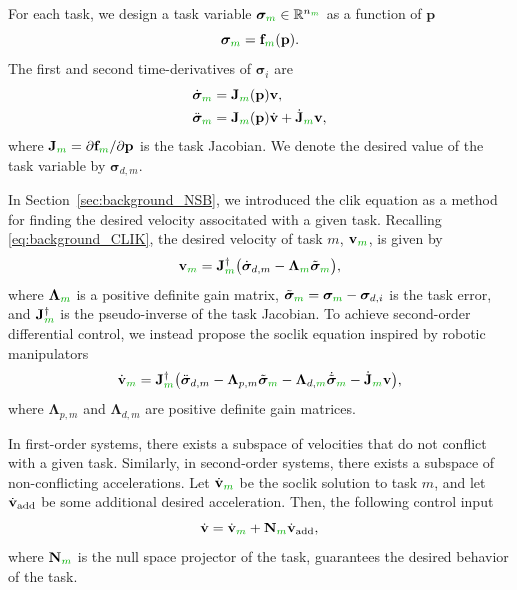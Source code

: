 For each task, we design a task variable $\bm{\sigma}_{\dm{m}} \in \mathbb{R}^{n_{\dm{m}}}$ as a function of $\mathbf{p}$
\begin{equation}
    \bm{\sigma}_{\dm{m}} = \mathbf{f}_{\dm{m}}(\mathbf{p}).
\end{equation}
The first and second time-derivatives of $\bm{\sigma}_i$ are
\begin{subequations}\label{eq:task_derivatives}
    \begin{align}
        \dot{\bm{\sigma}}_{\dm{m}} &= \mathbf{J}_{\dm{m}}(\mathbf{p})\ivel,\\
        \ddot{\bm{\sigma}}_{\dm{m}} &= \mathbf{J}_{\dm{m}}(\mathbf{p})\dot{\ivel} + \dot{\mathbf{J}}_{\dm{m}} \ivel,\label{eq:task_second_derivative}
    \end{align}
\end{subequations}
where $\mathbf{J}_{\dm{m}} = \partial \mathbf{f}_{\dm{m}}/\partial \mathbf{p}$ is the task Jacobian. We denote the desired value of the task variable by $\bm{\sigma}_{d, m}$.

In Section~\ref{sec:background_NSB}, we introduced the \acrfull{clik} equation as a method for finding the desired velocity associtated with a given task.
Recalling \eqref{eq:background_CLIK}, the desired velocity of task $m$, $\ivel_{\dm{m}}$, is given by
\begin{equation}
    \ivel_{\dm{m}} = \mathbf{J}_{\dm{m}}^\dagger\bigl(\dot{\bm{\sigma}}_{d, m} - \bm{\Lambda}_{\dm{m}} \Tilde{\bm{\sigma}}_{\dm{m}}\bigr),
\end{equation}
where $\bm{\Lambda}_{\dm{m}}$ is a positive definite gain matrix, $\Tilde{\bm{\sigma}}_{\dm{m}} = \bm{\sigma}_{\dm{m}} - \bm{\sigma}_{d,i}$ is the task error, and $\mathbf{J}_{\dm{m}}^\dagger$ is the pseudo-inverse of the task Jacobian. 
To achieve second-order differential control, we instead propose the \gls{soclik} equation inspired by robotic manipulators \cite{siciliano_closed-loop_1990}
\begin{equation}
    \dot{\ivel}_{\dm{m}} = \mathbf{J}_{\dm{m}}^\dagger \bigl(\ddot{\bm{\sigma}}_{d,m} - \mathbf{\Lambda}_{p,m}\Tilde{\bm{\sigma}}_{\dm{m}} - \mathbf{\Lambda}_{d,\dm{m}} \dot{\Tilde{\bm{\sigma}}}_{\dm{m}} - \dot{\mathbf{J}}_{\dm{m}} \ivel\bigr), \label{eq:general_acceleration}
\end{equation}
where $\mathbf{\Lambda}_{p,m}$ and $\mathbf{\Lambda}_{d,m}$ are positive definite gain matrices.

In first-order systems, there exists a subspace of velocities that do not conflict with a given task.
Similarly, in second-order systems, there exists a subspace of non-conflicting accelerations.
Let $\dot{\ivel}_{\dm{m}}$ be the \gls{soclik} solution to task $m$, and let $\dot{\mathbf{v}}_{\rm add}$ be some additional desired acceleration.
Then, the following control input
\begin{equation}
    \dot{\ivel} = \dot{\ivel}_{\dm{m}} +\mathbf{N}_{\dm{m}} \dot{\ivel}_{\rm add},
    \label{eq:NSB_two_tasks}
\end{equation}
where $\mathbf{N}_{\dm{m}}$ is the null space projector of the task, guarantees the desired behavior of the task.

